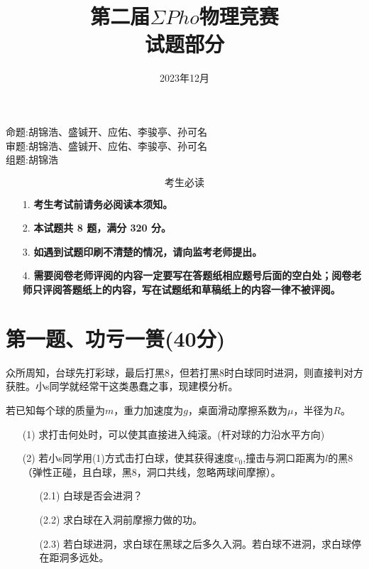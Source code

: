 \documentclass{article}
\title{\textbf{第二届$\Sigma Pho$物理竞赛}\\试题部分}
\date{2023年12月}
\begin{document}
\maketitle
\begin{flushright}
    命题:胡锦浩、盛铖开、应佑、李骏亭、孙可名\\
	审题:胡锦浩、盛铖开、应佑、李骏亭、孙可名\\
    组题:胡锦浩\\
\end{flushright}
$$\textbf{考生必读}$$
\begin{itemize}
\item[1.]\textbf{考生考试前请务必阅读本须知。}
\item[2.]\textbf{本试题共 8 题，满分 320 分。}
\item[3.]\textbf{如遇到试题印刷不清楚的情况，请向监考老师提出。}
\item[4.]\textbf{需要阅卷老师评阅的内容一定要写在答题纸相应题号后面的空白处；阅卷老师只评阅答题纸上的内容，写在试题纸和草稿纸上的内容一律不被评阅。}
\end{itemize}
\section*{第一题、功亏一篑(40分)}
众所周知，台球先打彩球，最后打黑8，但若打黑8时白球同时进洞，则直接判对方获胜。小s同学就经常干这类愚蠢之事，现建模分析。\par
若已知每个球的质量为$m$，重力加速度为$g$，桌面滑动摩擦系数为$\mu$，半径为$R$。
\begin{itemize}
\item[(1)]求打击何处时，可以使其直接进入纯滚。(杆对球的力沿水平方向)
\item[(2)]若小s同学用(1)方式击打白球，使其获得速度$v_0$,撞击与洞口距离为$l$的黑8（弹性正碰，且白球，黑8，洞口共线，忽略两球间摩擦）。
\begin{itemize}
\item[(2.1)]白球是否会进洞？
\item[(2.2)]求白球在入洞前摩擦力做的功。
\item[(2.3)]若白球进洞，求白球在黑球之后多久入洞。若白球不进洞，求白球停在距洞多远处。
\end{itemize}
\end{itemize}
\end{document}
